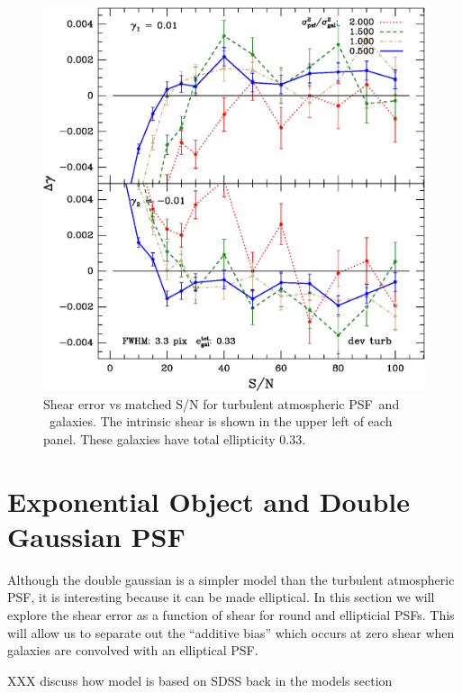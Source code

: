 \documentclass[12pt,preprint]{aastex}
\newcommand{\psf}{PSF}
\begin{document}
\begin{figure}[t] \centering \centering
\includegraphics[scale=0.7]{figures/gmix-fit-dt03r03r04-yr-0.005-0.005-diff.eps}

 \caption{Shear error vs matched S/N for turbulent atmospheric \psf\
 and \devauc\ galaxies. The intrinsic shear is shown in the upper left of
 each panel.  These galaxies have total ellipticity 0.33.
 \label{fig:dt03r03r04}}

\end{figure}




\section{Exponential Object and Double Gaussian \psf}

Although the double gaussian is a simpler model than the turbulent atmospheric \psf,
it is interesting because it can be made elliptical.  In this section we will explore
the shear error as a function of shear for round and ellipticial \psf s. This will allow
us to separate out the ``additive bias'' which occurs at zero shear when galaxies
are convolved with an elliptical \psf.

XXX discuss how model is based on SDSS back in the models section
\end{document}
